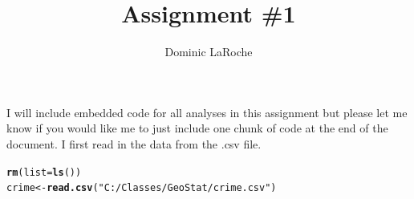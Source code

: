 \documentclass{article}\usepackage[]{graphicx}\usepackage[]{color}
\title{Assignment \#1}
\author{Dominic LaRoche}
\makeatletter
\newcommand{\hlstr}[1]{\textcolor[rgb]{0.192,0.494,0.8}{#1}}%
\newcommand{\hlstd}[1]{\textcolor[rgb]{0.345,0.345,0.345}{#1}}%
\newcommand{\hlkwb}[1]{\textcolor[rgb]{0.69,0.353,0.396}{#1}}%
\newcommand{\hlkwc}[1]{\textcolor[rgb]{0.333,0.667,0.333}{#1}}%
\newcommand{\hlkwd}[1]{\textcolor[rgb]{0.737,0.353,0.396}{\textbf{#1}}}%
\newenvironment{kframe}{%
 \def\at@end@of@kframe{}%
 \ifinner\ifhmode%
  \def\at@end@of@kframe{\end{minipage}}%
  \begin{minipage}{\columnwidth}%
 \fi\fi%
 \def\FrameCommand##1{\hskip\@totalleftmargin \hskip-\fboxsep
 \colorbox{shadecolor}{##1}\hskip-\fboxsep
     \hskip-\linewidth \hskip-\@totalleftmargin \hskip\columnwidth}%
 \MakeFramed {\advance\hsize-\width
   \@totalleftmargin\z@ \linewidth\hsize
   \@setminipage}}%
 {\par\unskip\endMakeFramed%
 \at@end@of@kframe}
\newenvironment{knitrout}{}{} %
\makeatother
\begin{document}
\maketitle

I will include embedded code for all analyses in this assignment but please let me know if you would like me to just include one chunk of code at the end of the document.  I first read in the data from the .csv file.\\
\begin{knitrout}
\color{fgcolor}\begin{kframe}
\begin{alltt}
\hlkwd{rm}\hlstd{(}\hlkwc{list}\hlstd{=}\hlkwd{ls}\hlstd{())}
\hlstd{crime}\hlkwb{<-}\hlkwd{read.csv}\hlstd{(}\hlstr{"C:/Classes/GeoStat/crime.csv"}\hlstd{)}
\end{alltt}
\end{kframe}
\end{knitrout}
\end{document}

